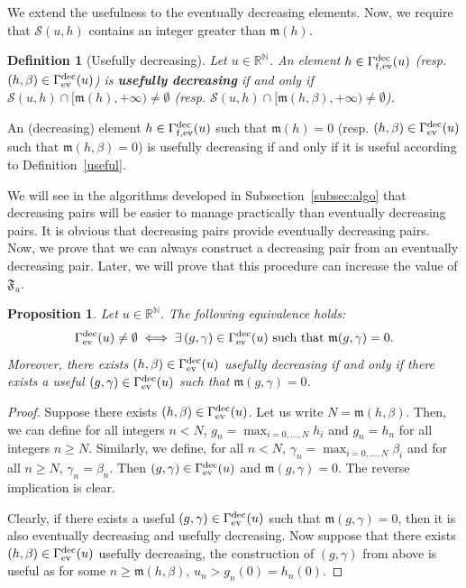 \documentclass{article}
\def\funset{\Gamma}
\def\fmong{\funset_{{\rm ev}}^{\rm dec}}
\def\fmonfung{{\funset}_{\rm f,{\rm ev}}^{\rm dec}}
\def\mon{\mathfrak{m}}
\def\Fu{\mathfrak{F}_u}
\def\rr{\mathbb R}
\def\nn{\mathbb N}
\def\res{\mathcal{S}}
\newtheorem{prop}{Proposition}
\newtheorem{defi}{Definition}
\def\blue#1{#1}
\begin{document}
	We extend the usefulness to the eventually decreasing elements. Now, we require that $\res(u,h)$ contains an integer greater than $\mon(h)$.   
	\begin{defi}[Usefully decreasing]
		Let $u\in\rr^\nn$. An element $h\in\fmonfung(u)$ (resp. $(h,\beta)\in \fmong(u)$) is {\bf usefully decreasing} if and only if $\res(u,h)\cap [\mon(h),+\infty)\neq \emptyset$ (resp. $\res(u,h)\cap [\mon(h,\beta),+\infty)\neq \emptyset$).
	\end{defi}
	An (\blue{decreasing}) element \blue{$h\in\fmonfung(u)$ such that $\mon(h)=0$ (resp. $(h,\beta)\in \fmong(u)$ such that $\mon(h,\beta)=0$)} is usefully decreasing if and only if it is useful \blue{according to} Definition~\ref{useful}. 
	
	We will see in the algorithms developed in Subsection~\ref{subsec:algo} that decreasing pairs will be easier to manage practically than eventually decreasing  pairs. It is obvious that decreasing pairs provide eventually decreasing pairs. Now, we prove that we can always construct a decreasing pair from an eventually decreasing pair. Later, we will prove that this procedure can increase the value of $\Fu$. 
	\begin{prop}
		\label{mongtomon0}
		Let $u\in\rr^\nn$. The following equivalence holds: 
		\[\fmong(u) \neq \emptyset\iff \blue{\exists\, (g,\gamma)\in\fmong(u) \text{ such that } \mon(g,\gamma)=0}.\] Moreover, there exists $(h,\beta)\in\fmong(u)$ usefully decreasing if and only if there exists a useful $(g,\gamma)\in\fmong(u)$ such that $\mon(g,\gamma)=0$. 
	\end{prop}
	\begin{proof}
		Suppose there exists $(h,\beta)\in\fmong(u)$. Let us write $N=\blue{\mon(h,\beta)}$. Then, we can define for all integers $n\blue{<} N$, $\blue{g_n=\max_{i=0,\ldots,N} h_i}$ and $\blue{g_n=h_n}$ for all integers $n\blue{\geq}N$. Similarly, we define, for all $n\blue{<} N$, $\blue{\gamma_n=\max_{i=0,\ldots,N} \beta_i}$ and for all $n\blue{\geq}N$, $\blue{\gamma_n=\beta_n}$. Then \blue{$(g,\gamma)\in\fmong(u)$ and $\mon(g,\gamma)=0$}. \blue{The reverse implication is clear.}
		
		Clearly, if there exists a \blue{useful $(g,\gamma)\in\fmong(u)$ such that $\mon(g,\gamma)=0$}, then it is also eventually decreasing and usefully decreasing. Now suppose that there exists $(h,\beta)\in\fmong(u)$ usefully decreasing, the construction of $(g,\gamma)$ from above is useful as for some $n\geq \mon(h,\beta)$, $u_n>g_n(0)=h_n(0)$.
	\end{proof}
	
\end{document}
